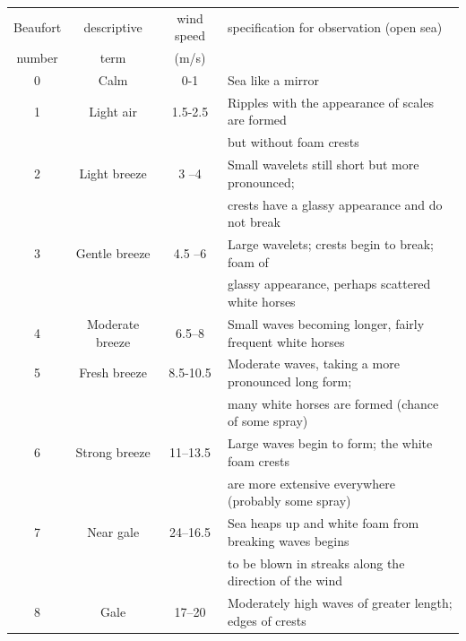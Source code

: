 \begin{table}
  \centering
  \begin{tabular}{|c|c|c|l|}
\hline
 Beaufort & descriptive     & wind speed  & specification for observation (open sea)  \\
 number   & term            &  (m/s)      &   \\
\hline
0               & Calm             &  0-1               & Sea like a mirror          \\
1               & Light air        &  1.5-2.5           & Ripples with the appearance of scales are formed \\
                &                  &                    & but without foam crests \\
2		& Light breeze     & 3 --4 		& Small wavelets still short but more pronounced; \\
                &                  &                    & crests have a glassy appearance and do not break \\
3               & Gentle breeze    & 4.5 --6            &  Large wavelets; crests begin to break;  foam of  \\
                &                  &                    & glassy appearance, perhaps scattered white horses \\
4		& Moderate breeze  & 6.5--8             &  Small waves becoming longer, fairly frequent white horses \\
5               & Fresh breeze     & 8.5-10.5           & Moderate waves, taking a more pronounced long form; \\
                &                  &                    & many white horses are formed (chance of some spray) \\
6               & Strong breeze    & 11--13.5           & Large waves begin to form; the white foam crests \\
                &                  &                    & are more extensive everywhere  (probably some spray)\\
7               &    Near gale     & 24--16.5           & Sea heaps up and white foam from breaking waves begins \\
                &                  &                    & to be blown in streaks along the direction of the wind \\
8               & Gale             & 17--20             & Moderately high waves of greater length; edges of crests \\

\end{tabular}
\end{table}
